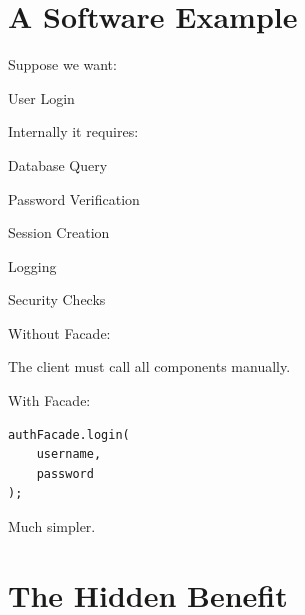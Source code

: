 \documentclass[11pt,a4paper]{book}
\begin{document}
\section{A Software Example}

Suppose we want:


User Login


Internally it requires:


Database Query


Password Verification


Session Creation


Logging


Security Checks


Without Facade:


The client must call all
components manually.


With Facade:

\begin{verbatim}
authFacade.login(
    username,
    password
);
\end{verbatim}


Much simpler.


\section{The Hidden Benefit}
\end{document}
